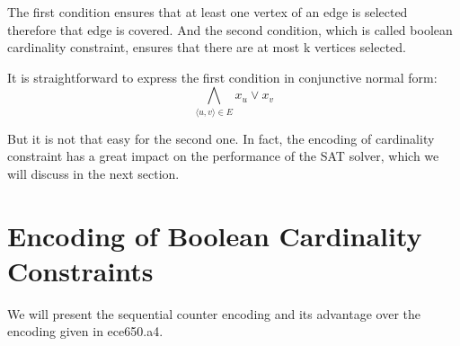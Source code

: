 \documentclass[11pt]{article}
\begin{document}
The first condition ensures that at least one vertex of an edge is selected therefore that edge is covered. And the second condition, which is called boolean cardinality constraint, ensures that there are at most k vertices selected.

It is straightforward to express the first condition in conjunctive normal form:\[\bigwedge\limits_{\langle u,v\rangle \in E} x_u \lor x_v \]

But it is not that easy for the second one. In fact, the encoding of cardinality constraint has a great impact on the performance of the SAT solver, which we will discuss in the next section.

\section{Encoding of Boolean Cardinality Constraints}\label{section-encoding}
We will present the sequential counter encoding\cite{10.1007/978-3-030-30446-1_7,10.1007/11564751_73} and its advantage over the encoding given in ece650.a4.
\end{document}
